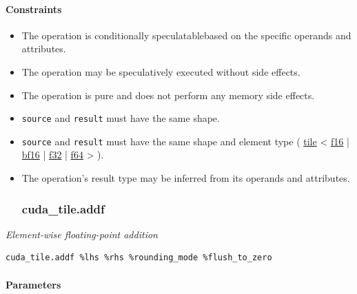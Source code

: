 \documentclass{article}
\begin{document}
\paragraph{Constraints}

\begin{itemize}
\item The operation is conditionally speculatablebased on the specific operands and attributes.
\item The operation may be speculatively executed without side effects.
\item The operation is pure and does not perform any memory side effects.
\item \texttt{source} and \texttt{result} must have the same shape.
\item \texttt{source} and \texttt{result} must have the same shape and element type ( \href{https://docs.nvidia.com/cuda/tile-ir/latest/sections/types.html#type-tile}{tile} < \href{https://docs.nvidia.com/cuda/tile-ir/latest/sections/types.html#subsection-element-types}{f16} | \href{https://docs.nvidia.com/cuda/tile-ir/latest/sections/types.html#subsection-element-types}{bf16} | \href{https://docs.nvidia.com/cuda/tile-ir/latest/sections/types.html#subsection-element-types}{f32} | \href{https://docs.nvidia.com/cuda/tile-ir/latest/sections/types.html#subsection-element-types}{f64} > ).
\item The operation's result type may be inferred from its operands and attributes.


\subsubsection{cuda\_tile.addf}

\end{itemize}
\textit{Element-wise floating-point addition}


\begin{lstlisting}
cuda_tile.addf %lhs %rhs %rounding_mode %flush_to_zero
\end{lstlisting}

\paragraph{Parameters}
\end{document}
